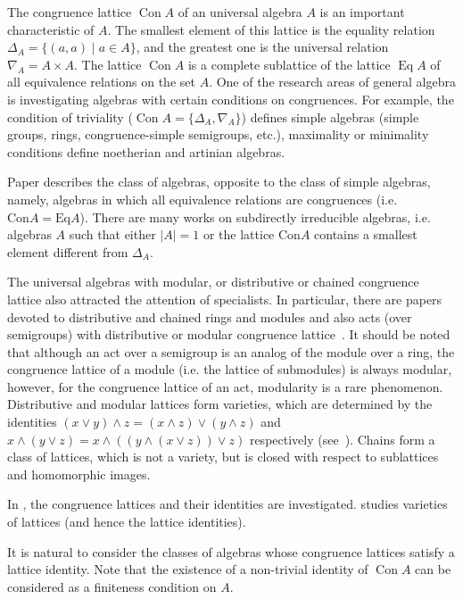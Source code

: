 \documentclass{birkau}
\numberwithin{equation}{section}
\theoremstyle{plain}
\theoremstyle{definition}
\DeclareMathOperator{\Con}{Con}
\DeclareMathOperator{\Eq}{Eq}
\begin{document}
	The congruence lattice $\Con A$ of an universal algebra $ A $ is an important characteristic of $A$. The smallest element of this lattice is the equality relation $ \Delta_A = \{ (a,a) \mid a \in A \} $, and the greatest one is the universal relation $ \nabla_A = A \times A $. The lattice $\Con A$ is a complete sublattice of the lattice $\Eq A$ of all equivalence relations on the set $A$.
    One of the research areas of general algebra is investigating algebras with certain conditions on congruences.	For example, the condition of triviality ($ \Con A = \{ \Delta_A, \nabla_A \} $) defines simple algebras (simple groups, rings, congruence-simple semigroups, etc.), maximality or minimality conditions define noetherian and artinian algebras.
	
	Paper \cite{resh} describes the class of algebras, opposite to the class of simple algebras, namely, algebras in which all equivalence relations are congruences (i.e. $ \text{Con}A = \text{Eq}A $).
    There are many works on subdirectly irreducible algebras, i.e. algebras $A$ such that either $ |A| = 1 $ or the lattice Con$A$ contains a smallest element different from $ \Delta_A $.
	
	The universal algebras with modular, or distributive or chained congruence lattice also attracted the attention of specialists. In particular, there are papers devoted to distributive and chained rings and modules and also acts (over semigroups) with distributive or modular congruence lattice~\cite{step,hal3}. It should be noted that although an act over a semigroup is an analog of the module over a ring, the congruence lattice of a module (i.e. the lattice of submodules) is always modular, however, for the congruence lattice of an act, modularity is a rare phenomenon. Distributive and modular lattices form varieties, which are determined by the identities $ (x \vee y) \wedge z = (x \wedge z ) \vee (y \wedge z) $ and $ x \wedge ( y \vee z ) = x \wedge (( y \wedge (x \vee z)) \vee z ) $ respectively (see~\cite[Chapter 4, Theorem 1.1]{gretz}).  Chains form a class of lattices, which is not a variety, but is closed with respect to sublattices and homomorphic images.
	
    In \cite{memoirs}, the congruence lattices and their identities are investigated. \cite{jipsen} studies varieties of lattices (and hence the lattice identities).
    
    It is natural to consider the classes of algebras whose congruence lattices satisfy a lattice identity.
    Note that the existence of a non-trivial identity of $\Con A$ can be considered as a finiteness condition on $A$.
    
\end{document}
